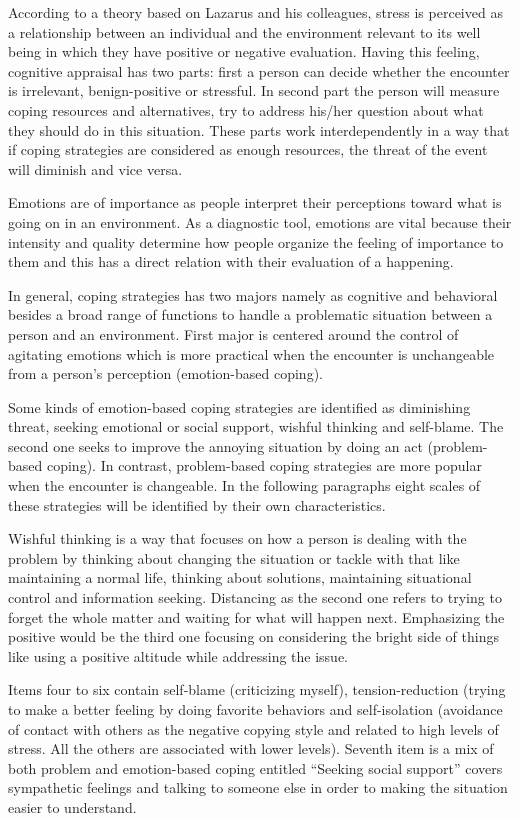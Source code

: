 \documentclass[
11pt, %
oneside, %
english, %
singlespacing, %
]{macthesis} %
\begin{document}
According to a theory based on Lazarus and his colleagues, stress is perceived as a relationship between an individual and the environment relevant to its well being in which they have positive or negative evaluation. Having this feeling, cognitive appraisal has two parts: first a person can decide whether the encounter is irrelevant, benign-positive or stressful. In second part the person will measure coping resources and alternatives, try to address his/her question about what they should do in this situation. These parts work interdependently in a way that if coping strategies are considered as enough resources, the threat of the event will diminish and vice versa.

Emotions are of importance as people interpret their perceptions toward what is going on in an environment. As a diagnostic tool, emotions are vital because their intensity and quality determine how people organize the feeling of importance to them and this has a direct relation with their evaluation of a happening.

In general, coping strategies has two majors namely as cognitive and behavioral besides a broad range of functions to handle a problematic situation between a person and an environment. First major is centered around the control of agitating emotions which is more practical when the encounter is unchangeable from a person's perception (emotion-based coping).

Some kinds of emotion-based coping strategies are identified as diminishing threat, seeking emotional or social support, wishful thinking and self-blame. The second one seeks to improve the annoying situation by doing an act (problem-based coping). In contrast, problem-based coping strategies are more popular when the encounter is changeable. In the following paragraphs eight scales of these strategies will be identified by their own characteristics.

Wishful thinking is a way that focuses on how a person is dealing with the problem by thinking about changing the situation or tackle with that like maintaining a normal life, thinking about solutions, maintaining situational control and information seeking. Distancing as the second one refers to trying to forget the whole matter and waiting for what will happen next. Emphasizing the positive would be the third one focusing on considering the bright side of things like using a positive altitude while addressing the issue.

Items four to six contain self-blame (criticizing myself), tension-reduction (trying to make a better feeling by doing favorite behaviors and self-isolation (avoidance of contact with others as the negative copying style and related to high levels of stress. All the others are associated with lower levels). Seventh item is a mix of both problem and emotion-based coping entitled ``Seeking social support'' covers sympathetic feelings and talking to someone else in order to making the situation easier to understand.
\end{document}
